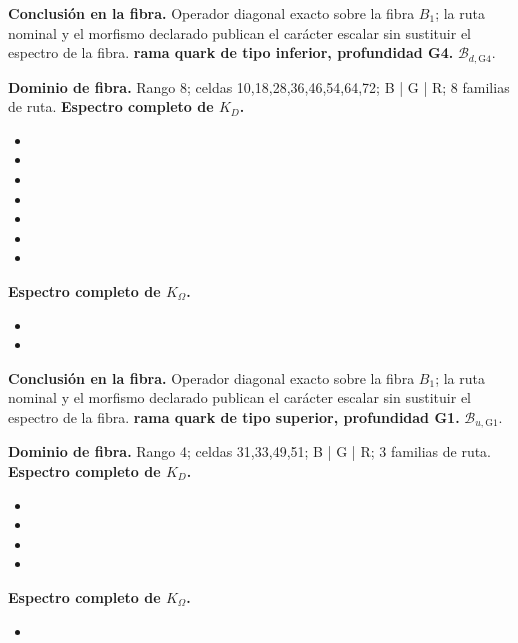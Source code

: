 \noindent\textbf{Conclusión en la fibra.} Operador diagonal exacto sobre la fibra \(B_1\); la ruta nominal y el morfismo declarado publican el carácter escalar sin sustituir el espectro de la fibra.
\medskip
{}
\noindent\textbf{rama quark de tipo inferior, profundidad G4.} \(\mathcal B_{d,\mathrm{G4}}\).\par
\noindent\textbf{Dominio de fibra.} Rango 8; celdas 10,18,28,36,46,54,64,72; B | G | R; 8 familias de ruta.
\noindent\textbf{Espectro completo de \(K_D\).}
\begin{itemize}
\item \texttt{}
\item \texttt{}
\item \texttt{}
\item \texttt{}
\item \texttt{}
\item \texttt{}
\item \texttt{}
\end{itemize}
\noindent\textbf{Espectro completo de \(K_\Omega\).}
\begin{itemize}
\item \texttt{}
\item \texttt{}
\end{itemize}
\noindent\textbf{Conclusión en la fibra.} Operador diagonal exacto sobre la fibra \(B_1\); la ruta nominal y el morfismo declarado publican el carácter escalar sin sustituir el espectro de la fibra.
\medskip
{}
\noindent\textbf{rama quark de tipo superior, profundidad G1.} \(\mathcal B_{u,\mathrm{G1}}\).\par
\noindent\textbf{Dominio de fibra.} Rango 4; celdas 31,33,49,51; B | G | R; 3 familias de ruta.
\noindent\textbf{Espectro completo de \(K_D\).}
\begin{itemize}
\item \texttt{}
\item \texttt{}
\item \texttt{}
\item \texttt{}
\end{itemize}
\noindent\textbf{Espectro completo de \(K_\Omega\).}
\begin{itemize}
\item \texttt{}
\end{itemize}
